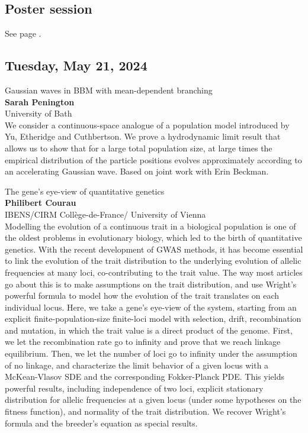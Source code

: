 \documentclass[12pt,a4paper]{article}
\begin{document}
\subsection*{Poster session}
See page \pageref{ss:poster}.

\newpage 
\subsection*{\sffamily Tuesday, May 21, 2024}

{\Large  
Gaussian waves in BBM with mean-dependent branching}\\[1ex]
{\large 
\textbf{Sarah Penington}\\[1ex] University of Bath}\\[2ex]
We consider a continuous-space analogue of a population model introduced by Yu, Etheridge and Cuthbertson. We prove a hydrodynamic limit result that allows us to show that for a large total population size, at large times the empirical distribution of the particle positions evolves approximately according to an accelerating Gaussian wave. 
Based on joint work with Erin Beckman.



\bigskip \bigskip  %

\noindent
{\Large The gene's eye-view of quantitative genetics}\\[1ex]
{\large 
\textbf{Philibert Courau}\\[1ex] IBENS/CIRM Collège-de-France/ University of Vienna}\\[2ex]
Modelling the evolution of a continuous trait in a biological population is one of the oldest problems in evolutionary biology, which led to the birth of quantitative genetics. With the recent development of GWAS methods, it has become essential to link the evolution of the trait distribution to the underlying evolution of allelic frequencies at many loci, co-contributing to the trait value. The way most articles go about this is to make assumptions on the trait distribution, and use Wright's powerful formula to model how the evolution of the trait translates on each individual locus. Here, we take a gene's eye-view of the system, starting from an explicit finite-population-size finite-loci model with selection, drift, recombination and mutation, in which the trait value is a direct product of the genome. First, we let the recombination rate go to infinity and prove that we reach linkage equilibrium. Then, we let the number of loci go to infinity under the assumption of no linkage, and characterize the limit behavior of a given locus with a McKean-Vlasov SDE and the corresponding Fokker-Planck PDE. This yields powerful results, including independence of two loci, explicit stationary distribution for allelic frequencies at a given locus (under some hypotheses on the fitness function), and normality of the trait distribution. We recover Wright's formula and the breeder's equation as special results.
\end{document}
